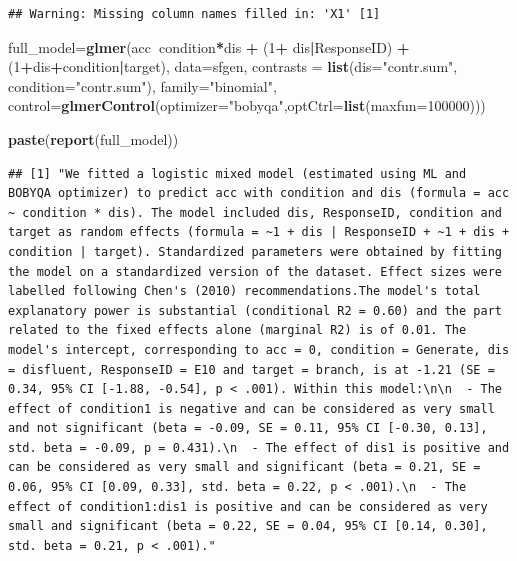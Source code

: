 \documentclass[pdf]{apa6}
\newenvironment{Shaded}{\begin{snugshade}}{\end{snugshade}}
\newcommand{\DataTypeTok}[1]{\textcolor[rgb]{0.13,0.29,0.53}{#1}}
\newcommand{\DecValTok}[1]{\textcolor[rgb]{0.00,0.00,0.81}{#1}}
\newcommand{\KeywordTok}[1]{\textcolor[rgb]{0.13,0.29,0.53}{\textbf{#1}}}
\newcommand{\NormalTok}[1]{#1}
\newcommand{\OperatorTok}[1]{\textcolor[rgb]{0.81,0.36,0.00}{\textbf{#1}}}
\newcommand{\StringTok}[1]{\textcolor[rgb]{0.31,0.60,0.02}{#1}}
\begin{document}
\begin{verbatim}
## Warning: Missing column names filled in: 'X1' [1]
\end{verbatim}

\begin{Shaded}
\begin{Highlighting}[]
\NormalTok{full_model=}\KeywordTok{glmer}\NormalTok{(acc}\OperatorTok{~}\NormalTok{condition}\OperatorTok{*}\NormalTok{dis }\OperatorTok{+}\StringTok{ }\NormalTok{(}\DecValTok{1}\OperatorTok{+}\StringTok{ }\NormalTok{dis}\OperatorTok{|}\NormalTok{ResponseID) }\OperatorTok{+}\StringTok{ }\NormalTok{(}\DecValTok{1}\OperatorTok{+}\NormalTok{dis}\OperatorTok{+}\NormalTok{condition}\OperatorTok{|}\NormalTok{target), }\DataTypeTok{data=}\NormalTok{sfgen, }\DataTypeTok{contrasts =} \KeywordTok{list}\NormalTok{(}\DataTypeTok{dis=}\StringTok{"contr.sum"}\NormalTok{, }\DataTypeTok{condition=}\StringTok{"contr.sum"}\NormalTok{), }\DataTypeTok{family=}\StringTok{"binomial"}\NormalTok{, }\DataTypeTok{control=}\KeywordTok{glmerControl}\NormalTok{(}\DataTypeTok{optimizer=}\StringTok{"bobyqa"}\NormalTok{,}\DataTypeTok{optCtrl=}\KeywordTok{list}\NormalTok{(}\DataTypeTok{maxfun=}\DecValTok{100000}\NormalTok{)))}



\KeywordTok{paste}\NormalTok{(}\KeywordTok{report}\NormalTok{(full_model))}
\end{Highlighting}
\end{Shaded}

\begin{verbatim}
## [1] "We fitted a logistic mixed model (estimated using ML and BOBYQA optimizer) to predict acc with condition and dis (formula = acc ~ condition * dis). The model included dis, ResponseID, condition and target as random effects (formula = ~1 + dis | ResponseID + ~1 + dis + condition | target). Standardized parameters were obtained by fitting the model on a standardized version of the dataset. Effect sizes were labelled following Chen's (2010) recommendations.The model's total explanatory power is substantial (conditional R2 = 0.60) and the part related to the fixed effects alone (marginal R2) is of 0.01. The model's intercept, corresponding to acc = 0, condition = Generate, dis = disfluent, ResponseID = E10 and target = branch, is at -1.21 (SE = 0.34, 95% CI [-1.88, -0.54], p < .001). Within this model:\n\n  - The effect of condition1 is negative and can be considered as very small and not significant (beta = -0.09, SE = 0.11, 95% CI [-0.30, 0.13], std. beta = -0.09, p = 0.431).\n  - The effect of dis1 is positive and can be considered as very small and significant (beta = 0.21, SE = 0.06, 95% CI [0.09, 0.33], std. beta = 0.22, p < .001).\n  - The effect of condition1:dis1 is positive and can be considered as very small and significant (beta = 0.22, SE = 0.04, 95% CI [0.14, 0.30], std. beta = 0.21, p < .001)."
\end{verbatim}
\end{document}
